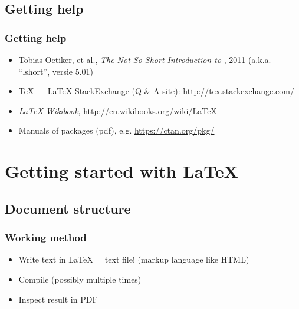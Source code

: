 \documentclass[aspectratio=169]{beamer}
\begin{document}
\subsection{Getting help}

\begin{frame}
  \frametitle{Getting help}

  \begin{itemize}
    \item Tobias Oetiker, et al., \emph{The Not So Short Introduction to {\LaTeXe}}, 2011 (a.k.a. ``lshort'', versie 5.01)
    \item {\TeX} --- {\LaTeX} StackExchange (Q \& A site): \url{http://tex.stackexchange.com/}
    \item \emph{{\LaTeX} Wikibook}, \url{http://en.wikibooks.org/wiki/LaTeX}
    \item Manuals of packages (pdf), e.g. \url{https://ctan.org/pkg/}
  \end{itemize}

\end{frame}

\section{Getting started with {\LaTeX}}

\subsection{Document structure}

\begin{frame}
  \frametitle{Working method}

  \begin{itemize}
    \item<+-> Write text in {\LaTeX}
    = text file! (markup language like HTML)
    \item<+-> Compile (possibly multiple times)
    \item<+-> Inspect result in PDF
  \end{itemize}
\end{frame}
\end{document}
